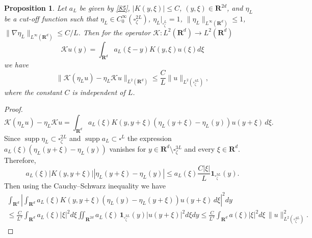 \documentclass[11pt]{article}
\def\RR{\R}
\newcommand{\R}{\mathbf{R}}
\newcommand\supp{\mathop{\operatorname{supp}}}
\newtheorem{proposition}[theorem]{Proposition}
\theoremstyle{remark}
\begin{document}
\begin{proposition}\label{p5.4}
 Let $a_L$ be given by \eqref{85},  $|K(y,\xi)|\leq C$, $(y,\xi)\in \R^{2d}$,  and $\eta_L$ be a cut-off function such that $\eta_L \in C_0^{\infty}(\square^{2L}_{\zeta})$, $\eta_L|_{\square^L_{\zeta}}=1$, $\|\eta_L\|_{L^{\infty}(\RR^d)}\leq 1$, $\|\nabla \eta_L\|_{L^{\infty}(\RR^d)} \leq C/L$.
Then for the operator $\mathcal{K}: L^2(\R^d) \to L^2(\R^d)$
$$
\mathcal{K} u(y) = \int_{\R^d} a_L (\xi-y) K(y,\xi)u(\xi) d\xi
$$
we have
\begin{equation*}%
\|\mathcal{K} (\eta_L u)  - \eta_L    \mathcal{K} u \|_{L^2(\R^d)} \leq \frac{C}{L}\| u \|_{L^2(\square^{4L}_{\zeta})},	
\end{equation*}
where the constant $C$ is independent of $L$.
\end{proposition}
\begin{proof}
	\begin{equation*}%
	\mathcal{K} (\eta_L u)  - \eta_L    \mathcal{K} u
 =\int_{\R^d} a_L(\xi) K(y,y+\xi)(\eta_L(y+\xi)-\eta_L(y))u(y+\xi) \, d\xi.
\end{equation*}
Since $\supp \eta_L\subset \square^{2L}_{\zeta }$ and $\supp a_L \subset \square^{L}$
the expression
$a_L (\xi)(\eta_L (y+\xi)-\eta_L (y))$ vanishes for  $y \in \R^d \setminus\square^{3L}_{\zeta} $  and every $\xi \in \mathbf{R}^d$. Therefore,
\begin{equation*}%
	a_L(\xi)|K(y,y+\xi)||\eta_L (y+\xi)-\eta_L(y)| \leq a_L(\xi)\frac{C|\xi|}{L}\mathbf{1}_{\square^{3L}_{\zeta}}(y).
\end{equation*} 	
Then using the Cauchy–Schwarz inequality we have
\begin{multline*}
	\int_{\R^d}	\left|\int_{\R^d} a_L(\xi) K(y,y+\xi)(\eta_L(y)-\eta_L(y+\xi))u(y+\xi) \, d\xi\right|^2 dy
	\\
	\le \frac{C}{L^2} \int_{\R^d} a_L(\xi) |\xi|^2 d\xi \iint_{\R^{2d}}  a_L(\xi) \,\mathbf{1}_{\square^{3L}_{\zeta}}(y) |u(y+\xi)|^2 d\xi dy
	\le \frac{C}{L^2} \int_{\R^d} a(\xi) |\xi|^2 d\xi  \, \|u\|^2_{L^2(\square^{4L}_{\zeta})}.
\end{multline*}
\end{proof}
\end{document}

